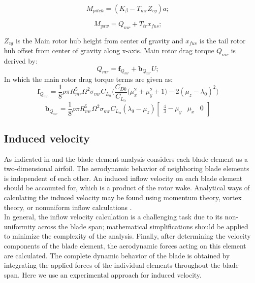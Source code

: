 \begin{equation}
	M_{pitch} = (K_\beta-T_{mr}Z_{cg})a;
\end{equation}

\begin{equation}
	M_{yaw} = Q_{mr}+T_{tr}x_{fus};
\end{equation}

$Z_{cg}$ is the Main rotor hub height from center of gravity and $x_{fus}$ is the tail rotor hub offset from center of gravity along x-axis.
Main rotor drag torque $Q_{mr}$ is derived by:
\begin{equation}
	Q_{mr} = \textbf{f}_{Q_{mr}}+\textbf{b}_{Q_{mr}}U;
\end{equation}
In which the main rotor drag torque terms are given as:
\begin{equation} \label{f_Q}
	\textbf{f}_{Q_{mr}}=\frac{1}{8} \rho \pi R_{mr}^5 \Omega^2 \sigma_{mr} C_{L_{\alpha}}  \bigg( \frac{C_{D0}}{C_{L_{\alpha}}} \Big( \mu_x^2+\mu_y^2+1 \Big)-2(\mu_{z}-\lambda_0)^2 \bigg)
\end{equation}
\begin{equation} \label{b_Q}
	\textbf{b}_{Q_{mr}}=\frac{1}{8} \rho \pi R_{mr}^5 \Omega^2 \sigma_{mr} C_{L_{\alpha}} (\lambda_0-\mu_z)  \begin{bmatrix}
		\frac{4}{3}
		-\mu_y&
		\mu_x &
		0
	\end{bmatrix}  
\end{equation}

\subsection{Induced velocity}

As indicated in \cite{johnson2012helicopter} and \cite{leishman2006principles} the blade element analysis considers each blade
element as a two-dimensional airfoil. The aerodynamic behavior of neighboring
blade elements is independent of each other. An induced inflow velocity on each
blade element should be accounted for, which is a product of the rotor wake. Analytical
ways of calculating the induced velocity may be found using momentum theory,
vortex theory, or nonuniform inflow calculations \cite{johnson2012helicopter}.\\

In general, the inflow velocity calculation is a challenging task due to its non-uniformity across the blade span; mathematical simplifications should be applied to minimize the complexity of the analysis. Finally, after determining the velocity components
of the blade element, the aerodynamic forces acting on this element are calculated.
The complete dynamic behavior of the blade is obtained by integrating the applied
forces of the individual elements throughout the blade span. Here we use an experimental approach for induced velocity. \\


